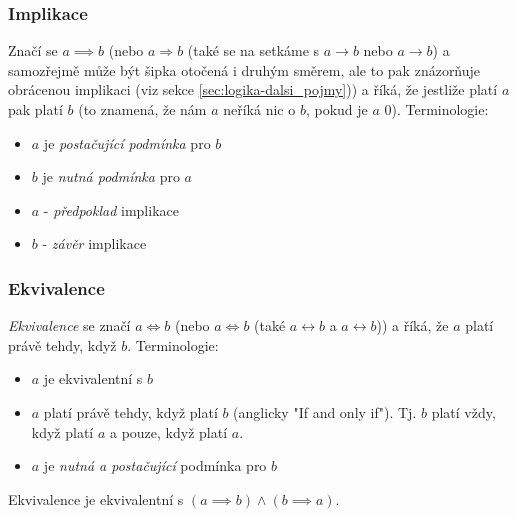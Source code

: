 \documentclass[12pt]{article}
\begin{document}
\subsubsection{Implikace}
Značí se $ a \implies b$ (nebo $a \Rightarrow b$ (také se na setkáme s $a \rightarrow b$ nebo $a \longrightarrow b $) a samozřejmě může být šipka otočená i druhým směrem, ale to pak znázorňuje obrácenou implikaci (viz sekce \ref{sec:logika-dalsi_pojmy})) a říká, že jestliže platí $a$ pak platí $b$ (to znamená, že nám $a$ neříká nic o $b$, pokud je $a$ 0). Terminologie:
\begin{itemize}
\item $a$ je \emph{postačující podmínka} pro $b$
\item $b$ je \emph{nutná podmínka} pro $a$
\item $a$ - \emph{předpoklad} implikace
\item $b$ - \emph{závěr} implikace
\end{itemize}
\subsubsection{Ekvivalence}
\emph{Ekvivalence} se značí $a \iff b$ (nebo $a \Leftrightarrow b$ (také $a \leftrightarrow b$ a $a \longleftrightarrow b$)) a říká, že $a$ platí právě tehdy, když $b$. Terminologie:
\begin{itemize}
\item $a$ je ekvivalentní s $b$
\item $a$ platí právě tehdy, když platí $b$ (anglicky "If and only if"). Tj. $b$ platí vždy, když platí $a$ a pouze, když platí $a$.
\item $a$ je \emph{nutná a postačující} podmínka pro $b$
\end{itemize}
Ekvivalence je ekvivalentní s $(a \implies b) \land (b \implies a)$.
\end{document}
